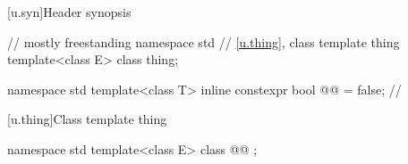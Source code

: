 [u.syn]{Header synopsis}

\begin{codeblock}
// mostly freestanding
namespace std {
  // \ref{u.thing}, class template thing
  template<class E> class thing;
}
\end{codeblock}

\begin{codeblock}
namespace std {
  template<class T> inline constexpr bool @@ = false; // \expos
}
\end{codeblock}

[u.thing]{Class template thing}

\begin{codeblock}
namespace std {
  template<class E>
  class @@ {};
}
\end{codeblock}
